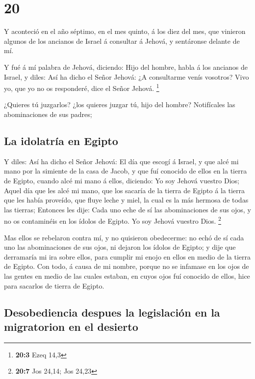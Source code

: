 \hypertarget{section-19}{%
\section{20}\label{section-19}}

 Y aconteció en el año séptimo, en el mes quinto, á los diez
del mes, que vinieron algunos de los ancianos de Israel á consultar á
Jehová, y sentáronse delante de mí.

 Y fué á mí palabra de Jehová, diciendo:  Hijo
del hombre, habla á los ancianos de Israel, y diles: Así ha dicho el
Señor Jehová: ¿A consultarme venís vosotros? Vivo yo, que yo no os
responderé, dice el Señor Jehová. \footnote{\textbf{20:3} Ezeq 14,3}

 ¿Quieres tú juzgarlos? ¿los quieres juzgar tú, hijo del
hombre? Notifícales las abominaciones de sus padres;

\hypertarget{la-idolatruxeda-en-egipto}{%
\subsection{La idolatría en Egipto}\label{la-idolatruxeda-en-egipto}}

 Y diles: Así ha dicho el Señor Jehová: El día que escogí á
Israel, y que alcé mi mano por la simiente de la casa de Jacob, y que
fuí conocido de ellos en la tierra de Egipto, cuando alcé mi mano á
ellos, diciendo: Yo soy Jehová vuestro Dios;  Aquel día que
les alcé mi mano, que los sacaría de la tierra de Egipto á la tierra que
les había proveído, que fluye leche y miel, la cual es la más hermosa de
todas las tierras;  Entonces les dije: Cada uno eche de sí
las abominaciones de sus ojos, y no os contaminéis en los ídolos de
Egipto. Yo soy Jehová vuestro Dios. \footnote{\textbf{20:7} Jos 24,14;
  Jos 24,23}

 Mas ellos se rebelaron contra mí, y no quisieron
obedecerme: no echó de sí cada uno las abominaciones de sus ojos, ni
dejaron los ídolos de Egipto; y dije que derramaría mi ira sobre ellos,
para cumplir mi enojo en ellos en medio de la tierra de Egipto.
 Con todo, á causa de mi nombre, porque no se infamase en
los ojos de las gentes en medio de las cuales estaban, en cuyos ojos fuí
conocido de ellos, hice para sacarlos de tierra de Egipto.

\hypertarget{desobediencia-despues-la-legislaciuxf3n-en-la-migratorion-en-el-desierto}{%
\subsection{Desobediencia despues la legislación en la migratorion en el
desierto}\label{desobediencia-despues-la-legislaciuxf3n-en-la-migratorion-en-el-desierto}}

